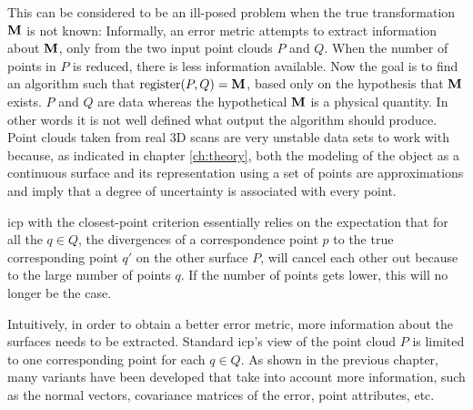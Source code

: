 This can be considered to be an ill-posed problem when the true transformation $\mathbf{M}$ is not known: Informally, an error metric attempts to extract information about $\mathbf{M}$, only from the two input point clouds $P$ and $Q$. When the number of points in $P$ is reduced, there is less information available. Now the goal is to find an algorithm such that $\text{register}(P, Q) = \mathbf{M}$, based only on the hypothesis that $\mathbf{M}$ exists. $P$ and $Q$ are data whereas the hypothetical $\mathbf{M}$ is a physical quantity. In other words it is not well defined what output the algorithm should produce. Point clouds taken from real 3D scans are very unstable data sets to work with because, as indicated in chapter \ref{ch:theory}, both the modeling of the object as a continuous surface and its representation using a set of points are approximations and imply that a degree of uncertainty is associated with every point.

\Gls{icp} with the closest-point criterion essentially relies on the expectation that for all the $q \in Q$, the divergences of a correspondence point $p$ to the true corresponding point $q'$ on the other surface $P$, will cancel each other out because to the large number of points $q$. If the number of points gets lower, this will no longer be the case.

Intuitively, in order to obtain a better error metric, more information about the surfaces needs to be extracted. Standard \gls{icp}'s view of the point cloud $P$ is limited to one corresponding point for each $q \in Q$. As shown in the previous chapter, many variants have been developed that take into account more information, such as the normal vectors, covariance matrices of the error, point attributes, etc.

